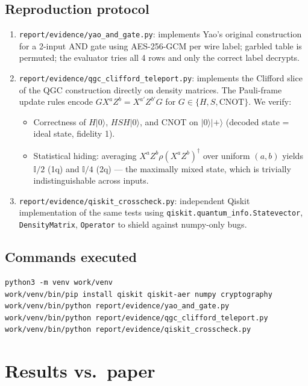 \documentclass[11pt]{article}
\begin{document}
\subsection{Reproduction protocol}
\begin{enumerate}
  \item \texttt{report/evidence/yao\_and\_gate.py}: implements Yao's original construction
        for a 2-input AND gate using AES-256-GCM per wire label; garbled table is
        permuted; the evaluator tries all 4 rows and only the correct label decrypts.
  \item \texttt{report/evidence/qgc\_clifford\_teleport.py}: implements the Clifford
        slice of the QGC construction directly on density matrices. The Pauli-frame
        update rules encode $G X^a Z^b = X^{a'} Z^{b'} G$ for $G \in \{H, S,
        \text{CNOT}\}$. We verify:
        \begin{itemize}
          \item Correctness of $H|0\rangle$, $HSH|0\rangle$, and CNOT on
                $|0\rangle|+\rangle$ (decoded state = ideal state, fidelity 1).
          \item Statistical hiding: averaging $X^a Z^b \rho (X^a Z^b)^\dagger$ over
                uniform $(a,b)$ yields $\mathbb{I}/2$ (1q) and $\mathbb{I}/4$ (2q) --- the
                maximally mixed state, which is trivially indistinguishable across inputs.
        \end{itemize}
  \item \texttt{report/evidence/qiskit\_crosscheck.py}: independent Qiskit implementation
        of the same tests using \texttt{qiskit.quantum\_info.Statevector},
        \texttt{DensityMatrix}, \texttt{Operator} to shield against numpy-only bugs.
\end{enumerate}

\subsection{Commands executed}
\begin{lstlisting}
python3 -m venv work/venv
work/venv/bin/pip install qiskit qiskit-aer numpy cryptography
work/venv/bin/python report/evidence/yao_and_gate.py
work/venv/bin/python report/evidence/qgc_clifford_teleport.py
work/venv/bin/python report/evidence/qiskit_crosscheck.py
\end{lstlisting}

\section{Results vs.\ paper}
\end{document}
